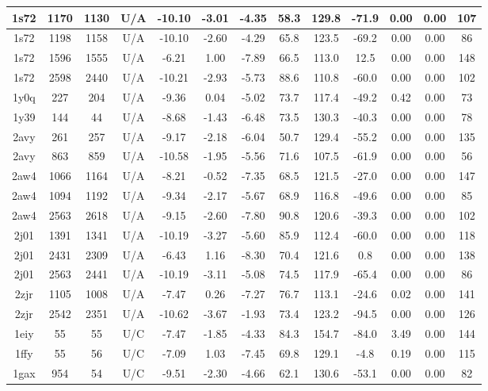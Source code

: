 {\begin{center}
\begin{longtable}{|c|c|c|c|c|c|c|c|c|c|c|c|c|}
1s72 & 1170 & 1130 & U/A & -10.10 & -3.01 & -4.35 & 58.3 & 129.8 & -71.9 & 0.00 & 0.00 & 107 \\ \hline
1s72 & 1198 & 1158 & U/A & -10.10 & -2.60 & -4.29 & 65.8 & 123.5 & -69.2 & 0.00 & 0.00 & 86 \\ \hline
1s72 & 1596 & 1555 & U/A & -6.21 & 1.00 & -7.89 & 66.5 & 113.0 & 12.5 & 0.00 & 0.00 & 148 \\ \hline
1s72 & 2598 & 2440 & U/A & -10.21 & -2.93 & -5.73 & 88.6 & 110.8 & -60.0 & 0.00 & 0.00 & 102 \\ \hline
1y0q & 227 & 204 & U/A & -9.36 & 0.04 & -5.02 & 73.7 & 117.4 & -49.2 & 0.42 & 0.00 & 73 \\ \hline
1y39 & 144 & 44 & U/A & -8.68 & -1.43 & -6.48 & 73.5 & 130.3 & -40.3 & 0.00 & 0.00 & 78 \\ \hline
2avy & 261 & 257 & U/A & -9.17 & -2.18 & -6.04 & 50.7 & 129.4 & -55.2 & 0.00 & 0.00 & 135 \\ \hline
2avy & 863 & 859 & U/A & -10.58 & -1.95 & -5.56 & 71.6 & 107.5 & -61.9 & 0.00 & 0.00 & 56 \\ \hline
2aw4 & 1066 & 1164 & U/A & -8.21 & -0.52 & -7.35 & 68.5 & 121.5 & -27.0 & 0.00 & 0.00 & 147 \\ \hline
2aw4 & 1094 & 1192 & U/A & -9.34 & -2.17 & -5.67 & 68.9 & 116.8 & -49.6 & 0.00 & 0.00 & 85 \\ \hline
2aw4 & 2563 & 2618 & U/A & -9.15 & -2.60 & -7.80 & 90.8 & 120.6 & -39.3 & 0.00 & 0.00 & 102 \\ \hline
2j01 & 1391 & 1341 & U/A & -10.19 & -3.27 & -5.60 & 85.9 & 112.4 & -60.0 & 0.00 & 0.00 & 118 \\ \hline
2j01 & 2431 & 2309 & U/A & -6.43 & 1.16 & -8.30 & 70.4 & 121.6 & 0.8 & 0.00 & 0.00 & 138 \\ \hline
2j01 & 2563 & 2441 & U/A & -10.19 & -3.11 & -5.08 & 74.5 & 117.9 & -65.4 & 0.00 & 0.00 & 86 \\ \hline
2zjr & 1105 & 1008 & U/A & -7.47 & 0.26 & -7.27 & 76.7 & 113.1 & -24.6 & 0.02 & 0.00 & 141 \\ \hline
2zjr & 2542 & 2351 & U/A & -10.62 & -3.67 & -1.93 & 73.4 & 123.2 & -94.5 & 0.00 & 0.00 & 126 \\ \hline
1eiy & 55 & 55 & U/C & -7.47 & -1.85 & -4.33 & 84.3 & 154.7 & -84.0 & 3.49 & 0.00 & 144 \\ \hline
1ffy & 55 & 56 & U/C & -7.09 & 1.03 & -7.45 & 69.8 & 129.1 & -4.8 & 0.19 & 0.00 & 115 \\ \hline
1gax & 954 & 54 & U/C & -9.51 & -2.30 & -4.66 & 62.1 & 130.6 & -53.1 & 0.00 & 0.00 & 82 \\ \hline

\end{longtable}
\end{center}}
